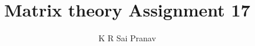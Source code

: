 \documentclass[journal,12pt,twocolumn]{IEEEtran}
\begin{document}
\makeatletter
{}
\makeatother
\let\StandardTheFigure\thefigure
\let\vec\mathbf
\renewcommand{\thefigure}{\theproblem}
\def\putbox#1#2#3{\makebox[0in][l]{\makebox[#1][l]{}\raisebox{\baselineskip}[0in][0in]{\raisebox{#2}[0in][0in]{#3}}}}
     \def\rightbox#1{\makebox[0in][r]{#1}}
     \def\centbox#1{\makebox[0in]{#1}}
     \def\topbox#1{\raisebox{-\baselineskip}[0in][0in]{#1}}
     \def\midbox#1{\raisebox{-0.5\baselineskip}[0in][0in]{#1}}
\vspace{3cm}
\title{Matrix theory Assignment 17}
\author{K R Sai Pranav}
%
%
%
% 
%
\end{document}

